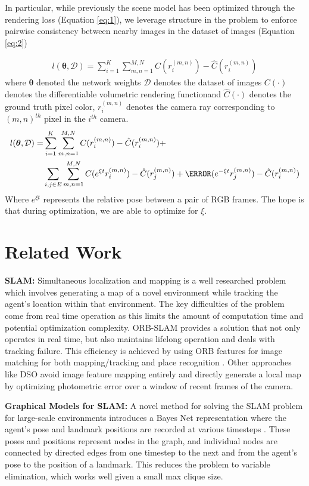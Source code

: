 \documentclass[15pt,letterpaper]{article}
\newcommand{\Dc}{\mathcal{D}}
\newcommand{\thetav     }{\boldsymbol \theta     }
\begin{document}
In particular, while previously the scene model has been optimized through the rendering loss (Equation \ref{eq:1}), we leverage structure in the problem to enforce pairwise consistency between nearby images in the dataset of images (Equation \ref{eq:2})

\begin{align}
    l(\thetav, \Dc) = \sum_{i = 1}^{K} \sum_{m,n = 1}^{M,N} C(r_i^{(m, n)}) - \hat{C}(r_i^{(m,n)}) \label{eq:1}
\end{align}
where $\thetav$ denoted the network weights $\Dc$ denotes the dataset of images $C(\cdot)$ denotes the differentiable volumetric rendering functionand $\hat{C}(\cdot)$ denotes the ground truth pixel color, $r_i^{(m, n)}$ denotes the camera ray corresponding to $(m, n)^{th}$ pixel in the $i^{th}$ camera.
\begin{align}
    l(\thetav, \Dc) = &\sum_{i = 1}^{K} \sum_{m,n = 1}^{M,N} C(r_i^{(m, n)}) - \hat{C}(r_i^{(m,n)}) + \nonumber\\
    &\sum_{i,j \in E} \sum_{m,n = 1}^{M,N} C(e^{\xi t} r_i^{(m, n)}) - \hat{C}(r_j^{(m,n)}) + \C(e^{-\xi t} r_j^{(m, n)}) - \hat{C}(r_i^{(m,n)}) \label{eq:2}
\end{align}
Where $e^{\xi t}$ represents the relative pose between a pair of RGB frames. The hope is that during optimization, we are able to optimize for $\xi$.

\section{Related Work}%
\label{sec:Related Work}
{\bf SLAM:}
Simultaneous localization and mapping is a well researched problem which involves generating a map of a novel environment while tracking the agent's location within that environment. The key difficulties of the problem come from real time operation as this limits the amount of computation time and potential optimization complexity. ORB-SLAM \cite{orb_slam} provides a solution that not only operates in real time, but also maintains lifelong operation and deals with tracking failure. This efficiency is achieved by using ORB features for image matching for both mapping/tracking and place recognition \cite{orb}. Other approaches like DSO \cite{direct_odometry} avoid image feature mapping entirely and directly generate a local map by optimizing photometric error over a window of recent frames of the camera.

{\bf Graphical Models for SLAM:}
A novel method for solving the SLAM problem for large-scale environments introduces a Bayes Net representation where the agent's pose and landmark positions are recorded at various timesteps \cite{isam2}. These poses and positions represent nodes in the graph, and individual nodes are connected by directed edges from one timestep to the next and from the agent's pose to the position of a landmark. This reduces the problem to variable elimination, which works well given a small max clique size.
\end{document}
